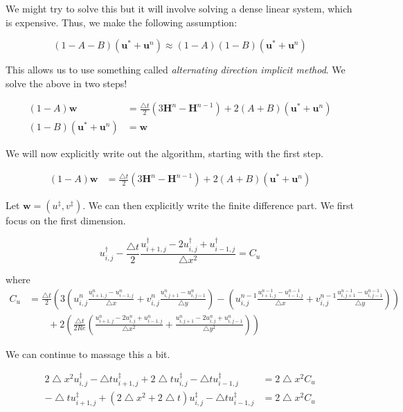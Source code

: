 \documentclass[12pt]{article}
\begin{document}
We might try to solve this but it will involve solving a dense linear system, which is expensive. Thus, we make the following assumption:

\begin{equation}
(1 - A - B)(\mathbf{u}^* + \mathbf{u}^n) \approx (1 - A)(1 - B)(\mathbf{u}^* + \mathbf{u}^n)
\end{equation}

This allows us to use something called \textit{alternating direction implicit method}. We solve the above in two steps!

\begin{align}
(1 - A)\mathbf{w} &= \frac{\bigtriangleup t}{2}(3\mathbf{H}^n - \mathbf{H}^{n-1}) + 2(A + B)(\mathbf{u}^* + \mathbf{u}^n) \\
(1 - B)(\mathbf{u}^* + \mathbf{u}^n) &= \mathbf{w}
\end{align}

We will now explicitly write out the algorithm, starting with the first step.

\begin{align*}
    (1 - A)\mathbf{w} &= \frac{\bigtriangleup t}{2}(3\mathbf{H}^n - \mathbf{H}^{n-1}) + 2(A + B)(\mathbf{u}^* + \mathbf{u}^n)
\end{align*}

Let $\mathbf{w} = (u^\ddagger, v^\ddagger)$. We can then explicitly write the finite difference part. We first focus on the first dimension.

\begin{equation}
    u^\dagger_{i,j} - \frac{\bigtriangleup t}{2} \frac{u^\dagger_{i+1,j} - 2u^\dagger_{i,j} + u^\dagger_{i-1,j}}{\bigtriangleup x^2} = C_u
\end{equation}

where
\begin{align*}
    C_u &= \frac{\bigtriangleup t}{2}(3(u^n_{i,j}\frac{u^n_{i+1,j} - u^n_{i-1,j}}{\bigtriangleup x} + v^n_{i,j}\frac{u^n_{i,j+1} - u^n_{i,j-1}}{\bigtriangleup y}) - (u^{n-1}_{i,j}\frac{u^{n-1}_{i+1,j} - u^{n-1}_{i-1,j}}{\bigtriangleup x} + v^{n-1}_{i,j}\frac{u^{n-1}_{i,j+1} - u^{n-1}_{i,j-1}}{\bigtriangleup y})) \\
    & \qquad + 2(\frac{\bigtriangleup t}{2 Re}(\frac{u^n_{i+1,j} -2u^n_{i,j} + u^n_{i-1,j}}{\bigtriangleup x^2} + \frac{u^n_{i,j+1} -2u^n_{i,j} + u^n_{i,j-1}}{\bigtriangleup y^2}))
\end{align*}

We can continue to massage this a bit.

\begin{align*}
    2\bigtriangleup x^2 u^\ddagger_{i,j} - \bigtriangleup t u^\ddagger_{i+1,j} + 2\bigtriangleup t u^\ddagger_{i,j} - \bigtriangleup t u^\ddagger_{i-1,j} &= 2\bigtriangleup x^2 C_u \\
    - \bigtriangleup tu^\ddagger_{i+1,j} + (2\bigtriangleup x^2 + 2\bigtriangleup t)u^\ddagger_{i,j} - \bigtriangleup t u^\ddagger_{i-1,j} &= 2\bigtriangleup x^2 C_u
\end{align*}
\end{document}

